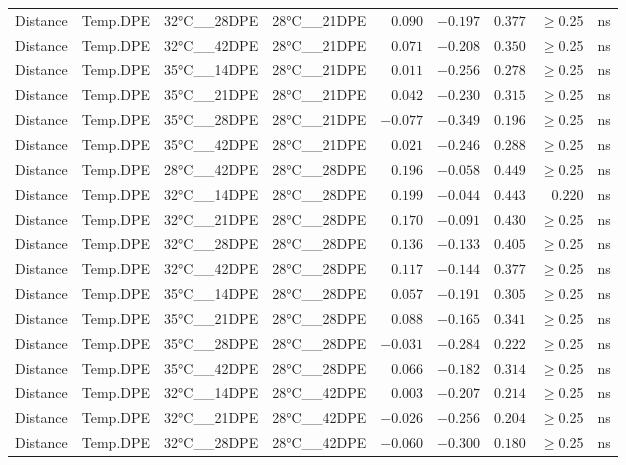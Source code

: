 \documentclass[
]{article}
\begin{document}
\begin{longtable}{llllrrrrl}
Distance & Temp.DPE & 32°C\_\_28DPE & 28°C\_\_21DPE & $0.090$ & $-0.197$ & $0.377$ & $\geq$0.25 & ns \\ 
Distance & Temp.DPE & 32°C\_\_42DPE & 28°C\_\_21DPE & $0.071$ & $-0.208$ & $0.350$ & $\geq$0.25 & ns \\ 
Distance & Temp.DPE & 35°C\_\_14DPE & 28°C\_\_21DPE & $0.011$ & $-0.256$ & $0.278$ & $\geq$0.25 & ns \\ 
Distance & Temp.DPE & 35°C\_\_21DPE & 28°C\_\_21DPE & $0.042$ & $-0.230$ & $0.315$ & $\geq$0.25 & ns \\ 
Distance & Temp.DPE & 35°C\_\_28DPE & 28°C\_\_21DPE & $-0.077$ & $-0.349$ & $0.196$ & $\geq$0.25 & ns \\ 
Distance & Temp.DPE & 35°C\_\_42DPE & 28°C\_\_21DPE & $0.021$ & $-0.246$ & $0.288$ & $\geq$0.25 & ns \\ 
Distance & Temp.DPE & 28°C\_\_42DPE & 28°C\_\_28DPE & $0.196$ & $-0.058$ & $0.449$ & $\geq$0.25 & ns \\ 
Distance & Temp.DPE & 32°C\_\_14DPE & 28°C\_\_28DPE & $0.199$ & $-0.044$ & $0.443$ & $0.220$ & ns \\ 
Distance & Temp.DPE & 32°C\_\_21DPE & 28°C\_\_28DPE & $0.170$ & $-0.091$ & $0.430$ & $\geq$0.25 & ns \\ 
Distance & Temp.DPE & 32°C\_\_28DPE & 28°C\_\_28DPE & $0.136$ & $-0.133$ & $0.405$ & $\geq$0.25 & ns \\ 
Distance & Temp.DPE & 32°C\_\_42DPE & 28°C\_\_28DPE & $0.117$ & $-0.144$ & $0.377$ & $\geq$0.25 & ns \\ 
Distance & Temp.DPE & 35°C\_\_14DPE & 28°C\_\_28DPE & $0.057$ & $-0.191$ & $0.305$ & $\geq$0.25 & ns \\ 
Distance & Temp.DPE & 35°C\_\_21DPE & 28°C\_\_28DPE & $0.088$ & $-0.165$ & $0.341$ & $\geq$0.25 & ns \\ 
Distance & Temp.DPE & 35°C\_\_28DPE & 28°C\_\_28DPE & $-0.031$ & $-0.284$ & $0.222$ & $\geq$0.25 & ns \\ 
Distance & Temp.DPE & 35°C\_\_42DPE & 28°C\_\_28DPE & $0.066$ & $-0.182$ & $0.314$ & $\geq$0.25 & ns \\ 
Distance & Temp.DPE & 32°C\_\_14DPE & 28°C\_\_42DPE & $0.003$ & $-0.207$ & $0.214$ & $\geq$0.25 & ns \\ 
Distance & Temp.DPE & 32°C\_\_21DPE & 28°C\_\_42DPE & $-0.026$ & $-0.256$ & $0.204$ & $\geq$0.25 & ns \\ 
Distance & Temp.DPE & 32°C\_\_28DPE & 28°C\_\_42DPE & $-0.060$ & $-0.300$ & $0.180$ & $\geq$0.25 & ns \\ 

\end{longtable}
\end{document}
